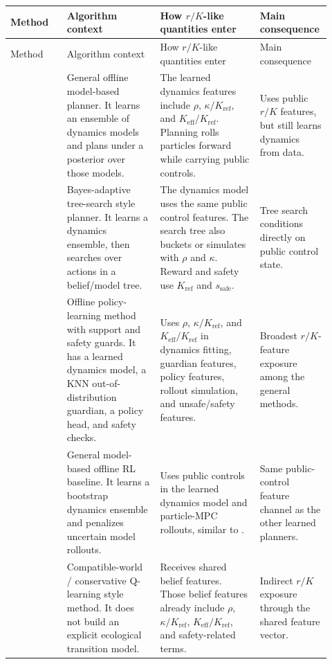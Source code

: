 \documentclass[11pt]{article}
\newcommand{\code}[1]{\texttt{\detokenize{#1}}}
\newcommand{\rhoctl}{\rho}
\newcommand{\kappactl}{\kappa}
\newcommand{\Keff}{K_{\mathrm{eff}}}
\newcommand{\Kref}{K_{\mathrm{ref}}}
\newcommand{\ssafe}{s_{\mathrm{safe}}}
\begin{document}
\begin{longtable}{p{0.17\linewidth}p{0.29\linewidth}p{0.30\linewidth}p{0.16\linewidth}}
\toprule
Method & Algorithm context & How \(r/K\)-like quantities enter & Main consequence \\
\midrule
\endfirsthead
\toprule
Method & Algorithm context & How \(r/K\)-like quantities enter & Main consequence \\
\midrule
\endhead
\code{refplan} &
General offline model-based planner. It learns an ensemble of dynamics models and plans under a posterior over those models. &
The learned dynamics features include \(\rhoctl\), \(\kappactl/\Kref\), and \(\Keff/\Kref\). Planning rolls particles forward while carrying public controls. &
Uses public \(r/K\) features, but still learns dynamics from data. \\

\code{bamcts} &
Bayes-adaptive tree-search style planner. It learns a dynamics ensemble, then searches over actions in a belief/model tree. &
The dynamics model uses the same public control features. The search tree also buckets or simulates with \(\rhoctl\) and \(\kappactl\). Reward and safety use \(\Kref\) and \(\ssafe\). &
Tree search conditions directly on public control state. \\

\code{ogsrl} &
Offline policy-learning method with support and safety guards. It has a learned dynamics model, a KNN out-of-distribution guardian, a policy head, and safety checks. &
Uses \(\rhoctl\), \(\kappactl/\Kref\), and \(\Keff/\Kref\) in dynamics fitting, guardian features, policy features, rollout simulation, and unsafe/safety features. &
Broadest \(r/K\)-feature exposure among the general methods. \\

\code{mopo} &
General model-based offline RL baseline. It learns a bootstrap dynamics ensemble and penalizes uncertain model rollouts. &
Uses public controls in the learned dynamics model and particle-MPC rollouts, similar to \code{refplan}. &
Same public-control feature channel as the other learned planners. \\

\code{delphic} &
Compatible-world / conservative Q-learning style method. It does not build an explicit ecological transition model. &
Receives shared belief features. Those belief features already include \(\rhoctl\), \(\kappactl/\Kref\), \(\Keff/\Kref\), and safety-related terms. &
Indirect \(r/K\) exposure through the shared feature vector. \\


\end{longtable}
\end{document}
